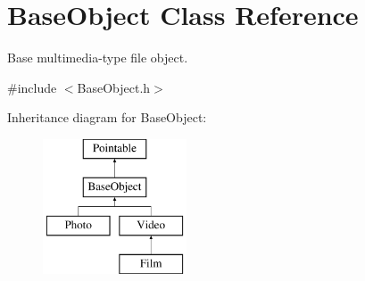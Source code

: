 \hypertarget{classBaseObject}{\section{Base\-Object Class Reference}
\label{classBaseObject}
}


Base multimedia-\/type file object.  




{\ttfamily \#include $<$Base\-Object.\-h$>$}

Inheritance diagram for Base\-Object\-:\begin{figure}[H]
\begin{center}
\leavevmode
\includegraphics[height=4.000000cm]{classBaseObject}
\end{center}
\end{figure}
